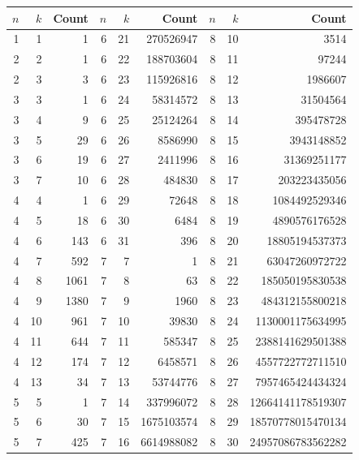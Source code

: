 \documentclass[reqno]{amsart}
\numberwithin{equation}{section}
\begin{document}
\begin{table}[htbp]
    \centering
    {\footnotesize
    \begin{tabular}{@{}rrr@{\hspace{5em}}rrr@{\hspace{5em}}rrr@{}}
        \toprule
       \textbf{$n$} & \textbf{$k$} & \textbf{Count} &  \textbf{$n$} &  \textbf{$k$} & \textbf{Count} &  \textbf{$n$} & \textbf{$k$} & \textbf{Count} \\ 
        \midrule
        1 & 1 & 1 & 6& 21 & 270526947& 8& 10 & 3514  \\
        2 & 2 & 1 & 6& 22 & 188703604& 8& 11 & 97244  \\
         2 & 3 & 3 & 6& 23 & 115926816 & 8& 12 & 1986607   \\
        3& 3 & 1 & 6& 24& 58314572 & 8& 13 & 31504564  \\
        3& 4 & 9 & 6& 25& 25124264 & 8& 14 & 395478728   \\
        3& 5 & 29 & 6& 26& 8586990 & 8& 15 & 3943148852  \\
        3& 6 & 19 & 6& 27& 2411996 & 8& 16 & 31369251177   \\
        3& 7 & 10 & 6& 28& 484830 & 8& 17 & 203223435056  \\
        4& 4 & 1 & 6& 29& 72648 & 8& 18 & 1084492529346  \\
        4& 5 & 18 & 6& 30 & 6484 & 8& 19 & 4890576176528  \\
        4& 6 & 143 & 6& 31 & 396 & 8& 20 & 18805194537373   \\
        4& 7 & 592 & 7& 7 & 1& 8& 21 & 63047260972722  \\
        4& 8 & 1061 & 7& 8 & 63& 8& 22 & 185050195830538  \\
        4& 9 & 1380 & 7& 9 & 1960& 8& 23 & 484312155800218  \\
        4& 10 & 961 & 7& 10 & 39830 & 8& 24 & 1130001175634995   \\
        4& 11 & 644 & 7& 11 & 585347 & 8& 25 & 2388141629501388   \\
        4& 12 & 174 & 7& 12 & 6458571& 8& 26 & 4557722772711510  \\
        4& 13 & 34 & 7& 13 & 53744776 & 8& 27 & 7957465424434324  \\
        5 & 5& 1& 7& 14 & 337996072& 8& 28 & 12664141178519307  \\
        5 & 6& 30& 7& 15 & 1675103574& 8& 29 & 18570778015470134  \\
        5 & 7& 425 & 7& 16 & 6614988082& 8& 30 & 24957086783562282  \\

\end{tabular}}
\end{table}
\end{document}
